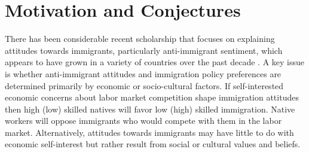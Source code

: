 \documentclass[12pt]{article}
\begin{document}



\section*{Motivation and Conjectures}

\par There has been considerable recent scholarship that focuses on explaining attitudes towards immigrants, particularly anti-immigrant sentiment, which appears to have grown in a variety of countries over the past decade \citep{Bohman2016}. A key issue is whether anti-immigrant attitudes and immigration policy preferences are determined primarily by economic or socio-cultural factors. If self-interested economic concerns about labor market competition shape immigration attitudes then high (low) skilled natives will favor low (high) skilled immigration.  Native workers will oppose immigrants who would compete with them in the labor market.   Alternatively, attitudes towards immigrants may have little to do with economic self-interest but rather result from social or cultural values and beliefs. 
\end{document}
